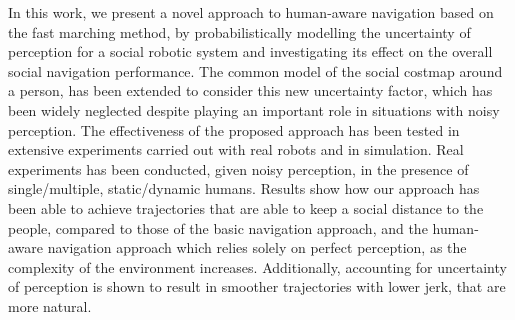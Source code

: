 In this work, we present a novel approach to human-aware navigation based on the fast marching method, by probabilistically modelling the uncertainty of perception for a social robotic system and investigating its effect on the overall social navigation performance. The common model of the social costmap around a person, has been extended to consider this new uncertainty factor, which has been widely neglected despite playing an important role in situations with noisy perception.  
The effectiveness of the proposed approach has been tested in extensive experiments carried out with real robots and in simulation. Real experiments has been conducted, given noisy perception, in the presence of single/multiple, static/dynamic humans. Results show how our approach has been able to achieve trajectories that are able to keep a social distance to the people, compared to those of the basic navigation approach, and the human-aware navigation approach which relies solely on perfect perception, as the complexity of the environment increases. Additionally, accounting for uncertainty of perception is shown to result in smoother trajectories with lower jerk, that are more natural. 


